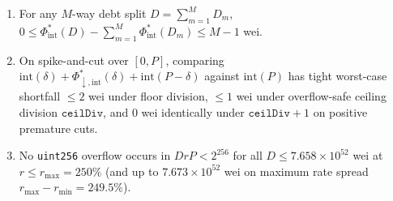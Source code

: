 \begin{theorem}
\begin{enumerate}[label=(\roman*), leftmargin=2.2em, itemsep=2pt]
\begin{enumerate}[label=(\alph*), leftmargin=1.8em, itemsep=1pt]
\item For any $M$-way debt split $D = \sum_{m=1}^M D_m$, $0 \le \Phi^*_{\mathrm{int}}(D) - \sum_{m=1}^M \Phi^*_{\mathrm{int}}(D_m) \le M - 1$ wei.
\item On spike-and-cut over $[0, P]$, comparing $\mathrm{int}(\delta) + \Phi^*_{\downarrow,\mathrm{int}}(\delta) + \mathrm{int}(P - \delta)$ against $\mathrm{int}(P)$ has tight worst-case shortfall $\le 2$ wei under floor division, $\le 1$ wei under overflow-safe ceiling division $\texttt{ceilDiv}$, and $0$ wei identically under $\texttt{ceilDiv} + 1$ on positive premature cuts.
\item No \texttt{uint256} overflow occurs in $D r P < 2^{256}$ for all $D \le 7.658 \times 10^{52}$ wei at $r \le r_{\max} = 250\%$ (and up to $7.673 \times 10^{52}$ wei on maximum rate spread $r_{\max} - r_{\min} = 249.5\%$).
\end{enumerate}
\end{enumerate}
\end{theorem}

